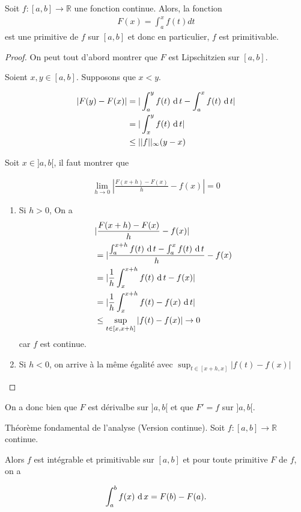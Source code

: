 \begin{theoreme}
    Soit $f : [a,b]\to \mathbb{R}$ une fonction continue.
    Alors, la fonction 
    \begin{align*}
        F(x) = \int_a^xf(t)dt
    \end{align*}
    est une primitive de $f$ sur $[a,b]$ et donc en particulier, $f$ est primitivable.
\end{theoreme}

\begin{proof}
    On peut tout d'abord montrer que $F$ est Lipschitzien sur $[a,b]$.

    Soient $x,y \in [a,b]$. Supposons que $x < y$.

    \begin{align*}
        |F(y) - F(x)| &= |\int_a^yf(t)\,\operatorname{d} t -  \int_a^xf(t)\,\operatorname{d} t|\\
        &=|\int_x^yf(t)\,\operatorname{d} t| \\
        &\le||f||_{\infty}(y-x)
    \end{align*}

    Soit $x\in ]a,b[$, il faut montrer que 

    \begin{align*}
        \lim_{h\to0}|\frac{F(x+h)-F(x)}{h}-f(x)| = 0
    \end{align*}

    \begin{enumerate}
        \item Si $h > 0$, On a 
        \begin{align*}
            & |\frac{F(x+h)-F(x)}{h}-f(x)|\\
            &= |\frac{\int_a^{x+h}f(t)\,\operatorname{d} t - \int_a^{x}f(t)\,\operatorname{d} t}{h}-f(x)\\
            &=|\frac{1}{h}\int_x^{x+h} f(t)\,\operatorname{d} t - f(x)|\\
            &=|\frac{1}{h}\int_x^{x+h} f(t)-f(x)\,\operatorname{d} t |\\
            &\le \sup_{t\in[x,x+h]}|f(t)-f(x)| \to 0
        \end{align*}
        car $f$ est continue.
        \item Si $h <0$, on arrive à la même égalité avec $\sup_{t\in [x+h,x]}|f(t)-f(x)|$
    \end{enumerate}
\end{proof}

On a donc bien que $F$ est dérivalbe sur $]a,b[$ et que $F'=f$ sur $]a,b[$.

\begin{theoreme}{Théorème fondamental de l'analyse (Version continue).}
    Soit $f : [a,b] \to \mathbb{R}$ continue.

    Alors $f$ est intégrable et primitivable sur $[a,b]$ et pour toute primitive $F$ de $f$, on a 

    \begin{align*}
        \int_a^bf(x)\,\operatorname{d} x = F(b) - F(a).
    \end{align*}
\end{theoreme}

